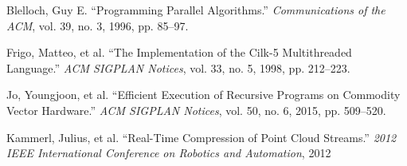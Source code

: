 \documentclass[twoside,twocolumn]{article}
\begin{document}
\begin{thebibliography}{15}

Blelloch, Guy E. “Programming Parallel Algorithms.”
\textit{Communications of the ACM}, vol. 39, no. 3, 1996, pp. 85–97.

Frigo, Matteo, et al. “The Implementation of the Cilk-5 Multithreaded Language.”
\textit{ACM SIGPLAN Notices}, vol. 33, no. 5, 1998, pp. 212–223.

Jo, Youngjoon, et al. “Efficient Execution of Recursive Programs on Commodity Vector Hardware.”
\textit{ACM SIGPLAN Notices}, vol. 50, no. 6, 2015, pp. 509–520.

Kammerl, Julius, et al. “Real-Time Compression of Point Cloud Streams.”
\textit{2012 IEEE International Conference on Robotics and Automation}, 2012
 
\end{thebibliography}

\end{document}
